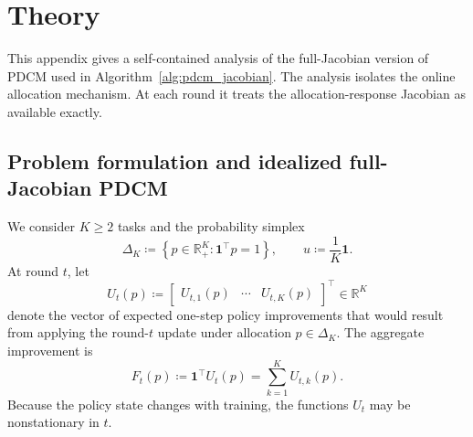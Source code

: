 
\section{Theory}
\label{app:theory}

This appendix gives a self-contained analysis of the full-Jacobian version of PDCM used in Algorithm~\ref{alg:pdcm_jacobian}. The analysis isolates the online allocation mechanism. At each round it treats the allocation-response Jacobian as available exactly.

\subsection{Problem formulation and idealized full-Jacobian PDCM}
\label{app:theory_setup}

We consider $K\ge 2$ tasks and the probability simplex
\begin{equation}
    \Delta_K
    \coloneqq
    \left\{p\in\mathbb{R}_+^K:\mathbf{1}^\top p=1\right\},
    \qquad
    u\coloneqq \frac{1}{K}\mathbf{1}.
\end{equation}
At round $t$, let
\begin{equation}
    U_t(p)
    \coloneqq
    \begin{bmatrix}
        U_{t,1}(p) & \cdots & U_{t,K}(p)
    \end{bmatrix}^{\!\top}\in\mathbb{R}^K
\end{equation}
denote the vector of expected one-step policy improvements that would result from applying the round-$t$ update under allocation $p\in\Delta_K$. The aggregate improvement is
\begin{equation}
    F_t(p)\coloneqq \mathbf{1}^\top U_t(p)=\sum_{k=1}^K U_{t,k}(p).
    \label{eq:app_aggregate_utility}
\end{equation}
Because the policy state changes with training, the functions $U_t$ may be nonstationary in $t$.

